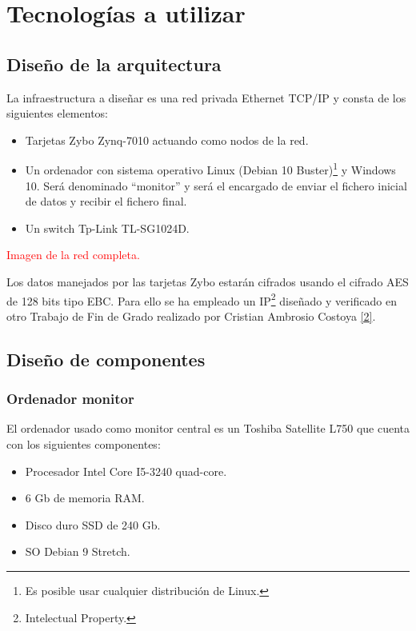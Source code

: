 \section{Tecnologías a utilizar}
\subsection{Diseño de la arquitectura}
La infraestructura a diseñar es una red privada Ethernet TCP/IP y consta de los siguientes elementos:
\begin{itemize}
	\item Tarjetas Zybo Zynq-7010 actuando como nodos de la red.
	\item Un ordenador con sistema operativo Linux (Debian 10 Buster)\footnote{Es posible usar cualquier distribución de Linux.} y Windows 10. Será denominado ``monitor'' y será el encargado de enviar el fichero inicial de datos y recibir el fichero final.
	\item Un switch Tp-Link TL-SG1024D.
\end{itemize}

\textcolor{red}{Imagen de la red completa.}

Los datos manejados por las tarjetas Zybo estarán cifrados usando el cifrado AES de 128 bits tipo EBC. Para ello se ha empleado un IP\footnote{Intelectual Property.} diseñado y verificado en otro Trabajo de Fin de Grado realizado por Cristian Ambrosio Costoya \hyperlink{2}{[2]}.

\subsection{Diseño de componentes}
\subsubsection{Ordenador monitor}
El ordenador usado como monitor central es un Toshiba Satellite L750 que cuenta con los siguientes componentes:
\begin{itemize}
	\item Procesador Intel Core I5-3240 quad-core.
	\item 6 Gb de memoria RAM.
	\item Disco duro SSD de 240 Gb.
	\item SO Debian 9 Stretch.
\end{itemize}

